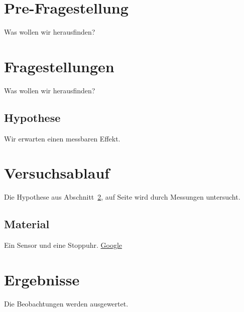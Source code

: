 \documentclass{scrartcl}
\begin{document}
\tableofcontents
\newpage

\section{Pre-Fragestellung}
Was wollen wir herausfinden?
\newpage
\section{Fragestellungen}\label{sec:frage}
Was wollen wir herausfinden?
\newpage
\subsection{Hypothese}
Wir erwarten einen messbaren Effekt.
\section{Versuchsablauf}
Die Hypothese aus Abschnitt~\ref{sec:frage},  auf Seite \pageref{sec:frage}
wird durch Messungen untersucht.
\subsection{Material}
Ein Sensor und eine Stoppuhr.
\href{www.google.de}{Google}
\section{Ergebnisse}
Die Beobachtungen werden ausgewertet.
\end{document}
